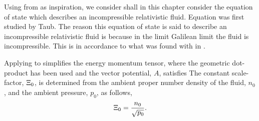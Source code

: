Using  from  as inspiration, 
we consider shall in this chapter consider the equation of state 
which describes an incompressible relativistic fluid.
Equation  was first studied by Taub\cite{Taub1978}.
The reason this equation of state is said to describe an incompressible relativistic fluid
is because in the limit Galilean limit the fluid is incompressible.
This is in accordance to what was found with  in .





Applying  to  simplifies the energy momentum tensor,
where the geometric dot-product has been used and the vector potential, $A$,  satisfies
The constant scale-factor, $\Xi_0$, is determined from the ambient proper number density of the fluid, $n_0$, and the ambient pressure, $p_0$, as follows,
\begin{align}
\Xi_0 = \frac{n_0}{\sqrt{p_0}}. 
\label{eqn:scalefactor}
\end{align}

